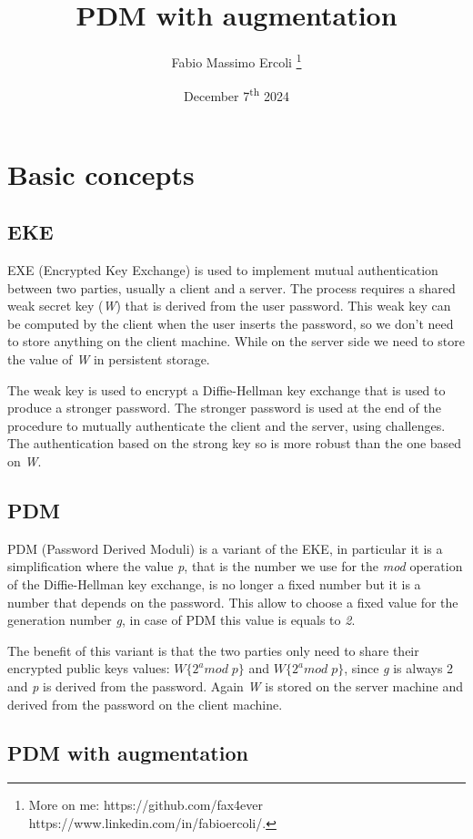 \documentclass{article}
\title{PDM with augmentation}
\author{Fabio Massimo Ercoli
	\footnote{
		More on me:
		https://github.com/fax4ever
		https://www.linkedin.com/in/fabioercoli/.
}}
\date{December 7\textsuperscript{th} 2024}
\begin{document}
\maketitle
\thispagestyle{empty}
	
\section{Basic concepts}

\subsection{EKE}

EXE (Encrypted Key Exchange) is used to implement mutual authentication
between two parties, usually a client and a server.
The process requires a shared weak secret key (\emph{W}) that is derived from the user password.
This weak key can be computed by the client when the user inserts the password,
so we don't need to store anything on the client machine.
While on the server side we need to store the value of \emph{W} in persistent storage.

The weak key is used to encrypt a Diffie-Hellman key exchange
that is used to produce a stronger password.
The stronger password is used at the end of the procedure to 
mutually authenticate the client and the server,
using challenges. The authentication based on the strong key so is more robust
than the one based on \emph{W}.

\subsection{PDM}

PDM (Password Derived Moduli) is a variant of the EKE, 
in particular it is a simplification where the value \emph{p},
that is the number we use for the \emph{mod} operation
of the Diffie-Hellman key exchange,
is no longer a fixed number but it is a number that depends on the password.
This allow to choose a fixed value for the generation number \emph{g},
in case of PDM this value is equals to \emph{2}.

The benefit of this variant is that the two parties 
only need to share their encrypted public keys values:
$W\{2^a mod \; p\}$ and $W\{2^a mod \; p\}$,
since \emph{g} is always 2 and \emph{p} is derived from the password.
Again \emph{W} is stored on the server machine and derived from
the password on the client machine.

\subsection{PDM with augmentation}
\end{document}
